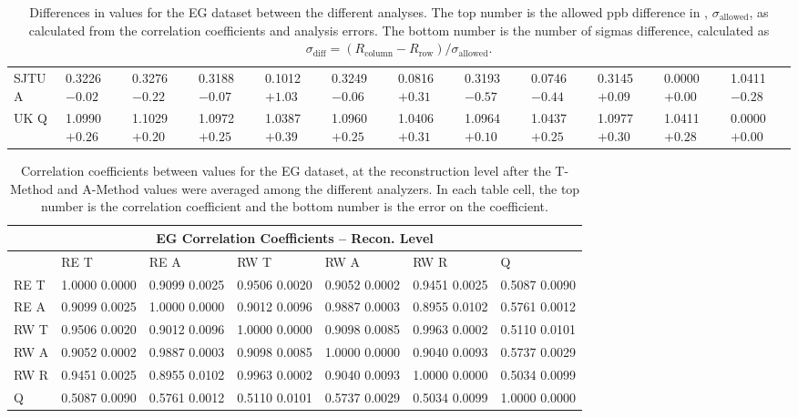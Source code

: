 \begin{landscape}
\begin{table}
\begin{tabularx}{1\linewidth}{@{\extracolsep{\fill}}lXXXXXXXXXXX}
	SJTU A & 0.3226 $-0.02$ & 0.3276 $-0.22$ & 0.3188 $-0.07$ & 0.1012 $+1.03$ & 0.3249 $-0.06$ & 0.0816 $+0.31$ & 0.3193 $-0.57$ & 0.0746 $-0.44$ & 0.3145 $+0.09$ & 0.0000 $+0.00$ & 1.0411 $-0.28$  \\
	UK Q   & 1.0990 $+0.26$ & 1.1029 $+0.20$ & 1.0972 $+0.25$ & 1.0387 $+0.39$ & 1.0960 $+0.25$ & 1.0406 $+0.31$ & 1.0964 $+0.10$ & 1.0437 $+0.25$ & 1.0977 $+0.30$ & 1.0411 $+0.28$ & 0.0000 $+0.00$  \\
  \bottomrule
\end{tabularx}
\caption[]{Differences in \R values for the EG dataset between the different analyses. The top number is the allowed ppb difference in \R, $\sigma_{\text{allowed}}$, as calculated from the correlation coefficients and analysis errors. The bottom number is the number of sigmas difference, calculated as $\sigma_{\text{diff}} = (R_{\text{column}}-R_{\text{row}})/\sigma_{\text{allowed}}$.}
\label{tab:EG_diff}
\end{table}
\end{landscape}


\begin{table}
\setlength\tabcolsep{15pt}
\small
\centering
\renewcommand{\arraystretch}{1.4}
\begin{tabularx}{0.8\linewidth}{@{\extracolsep{\fill}}lXXXXXX}
  \toprule
  	\multicolumn{7}{c}{{\normalsize EG Correlation Coefficients -- Recon. Level}} \\
  \midrule
  	       & RE T & RE A & RW T & RW A & RW R & \quad Q \\
  \midrule
	RE T   & 1.0000 0.0000 & 0.9099 0.0025 & 0.9506 0.0020 & 0.9052 0.0002 & 0.9451 0.0025 & 0.5087 0.0090  \\
	RE A   & 0.9099 0.0025 & 1.0000 0.0000 & 0.9012 0.0096 & 0.9887 0.0003 & 0.8955 0.0102 & 0.5761 0.0012  \\
	RW T   & 0.9506 0.0020 & 0.9012 0.0096 & 1.0000 0.0000 & 0.9098 0.0085 & 0.9963 0.0002 & 0.5110 0.0101  \\
	RW A   & 0.9052 0.0002 & 0.9887 0.0003 & 0.9098 0.0085 & 1.0000 0.0000 & 0.9040 0.0093 & 0.5737 0.0029  \\
	RW R   & 0.9451 0.0025 & 0.8955 0.0102 & 0.9963 0.0002 & 0.9040 0.0093 & 1.0000 0.0000 & 0.5034 0.0099  \\
	Q      & 0.5087 0.0090 & 0.5761 0.0012 & 0.5110 0.0101 & 0.5737 0.0029 & 0.5034 0.0099 & 1.0000 0.0000  \\
  \bottomrule
\end{tabularx}
\caption[]{Correlation coefficients between \R values for the EG dataset, at the reconstruction level after the \RW T-Method and A-Method \R values were averaged among the different analyzers. In each table cell, the top number is the correlation coefficient and the bottom number is the error on the coefficient.}
\label{tab:Corrs_EG_recon}
\end{table}


